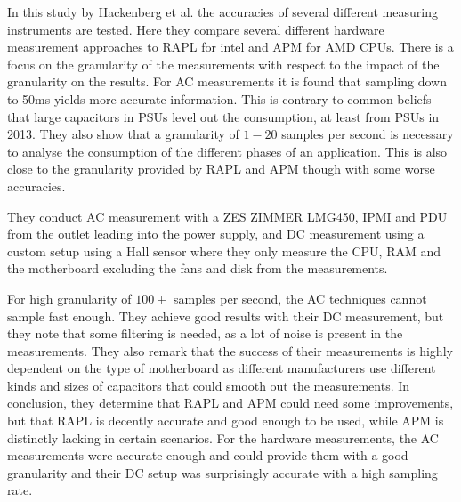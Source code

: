 In this study by Hackenberg et al.\cite{hackenberg2013} the accuracies of several different measuring instruments are tested. Here they compare several different hardware measurement approaches to RAPL for intel and APM for AMD CPUs. There is a focus on the granularity of the measurements with respect to the impact of the granularity on the results. For AC measurements it is found that sampling down to 50ms yields more accurate information. This is contrary to common beliefs that large capacitors in PSUs level out the consumption, at least from PSUs in 2013. They also show that a granularity of $1-20$ samples per second is necessary to analyse the consumption of the different phases of an application. This is also close to the granularity provided by RAPL and APM though with some worse accuracies.

They conduct AC measurement with a ZES ZIMMER LMG450, IPMI and PDU from the outlet leading into the power supply, and DC measurement using a custom setup using a Hall sensor where they only measure the CPU, RAM and the motherboard excluding the fans and disk from the measurements.

For high granularity of $100+$ samples per second, the AC techniques cannot sample fast enough. They achieve good results with their DC measurement, but they note that some filtering is needed, as a lot of noise is present in the measurements. They also remark that the success of their measurements is highly dependent on the type of motherboard as different manufacturers use different kinds and sizes of capacitors that could smooth out the measurements. In conclusion, they determine that RAPL and APM could need some improvements, but that RAPL is decently accurate and good enough to be used, while APM is distinctly lacking in certain scenarios. For the hardware measurements, the AC measurements were accurate enough and could provide them with a good granularity and their DC setup was surprisingly accurate with a high sampling rate.